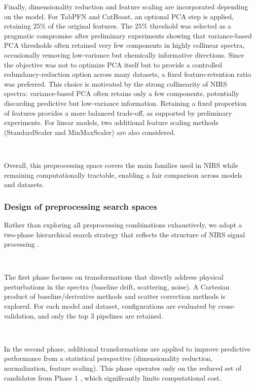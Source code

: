 \documentclass{article}
\begin{document}
Finally, dimensionality reduction and feature scaling are incorporated depending on the model. For TabPFN and CatBoost, an optional PCA step is applied, retaining $25\%$ of the original features. The $25\%$ threshold was selected as a pragmatic compromise after preliminary experiments showing that variance-based PCA thresholds often retained very few components in highly collinear spectra, occasionally removing low-variance but chemically informative directions. Since the objective was not to optimize PCA itself but to provide a controlled redundancy-reduction option across many datasets, a fixed feature-retention ratio was preferred. This choice is motivated by the strong collinearity of NIRS spectra: variance-based PCA often retains only a few components, potentially discarding predictive but low-variance information. Retaining a fixed proportion of features provides a more balanced trade-off, as supported by preliminary experiments. For linear models, two additional feature scaling methods (StandardScaler and MinMaxScaler) are also considered.

~

Overall, this preprocessing space covers the main families used in NIRS while remaining computationally tractable, enabling a fair comparison across models and datasets.



\subsubsection{Design of preprocessing search spaces}

Rather than exploring all preprocessing combinations exhaustively, we adopt a two-phase  hierarchical search strategy that reflects the structure of NIRS signal processing \cite{Rinnan2009Preprocessing}.

~

The first phase  focuses on transformations that directly address physical perturbations in the spectra  (baseline drift, scattering, noise). A Cartesian product of baseline/derivative methods and scatter correction methods is explored. For each model and dataset, configurations are evaluated by cross-validation, and only the top 3  pipelines are retained.

~

In the second phase, additional transformations are applied to improve predictive performance from a statistical perspective (dimensionality reduction, normalization, feature scaling). This phase operates only on the reduced set of candidates from Phase 1 , which significantly limits computational cost.
\end{document}
